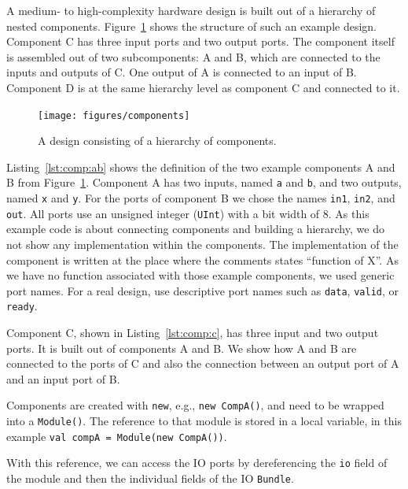 \documentclass[%
    10pt,
    headinclude, footexclude,
    openright, %
    notitlepage,
    cleardoubleempty,
    headsepline,
    pointlessnumbers,
    bibtotoc, idxtotoc,
    ]{scrbook}
\newcommand{\code}[1]{{\small{\texttt{#1}}}}
\begin{document}
A medium- to high-complexity hardware design is built out of a hierarchy of
nested components.
Figure~\ref{fig:components} shows the structure of such an example design. Component C has
three input ports and two output ports. The component itself is assembled out
of two subcomponents: A and B, which are connected to the inputs and
outputs of C. One output of A is connected to an input of B.
Component D is at the same hierarchy level as component C and connected
to it.

\begin{figure}
  \centering
  \texttt{[image: figures/components]}
  \caption{A design consisting of a hierarchy of components.}
  \label{fig:components}
\end{figure}


Listing~\ref{lst:comp:ab} shows the definition of the two example components A and B from
Figure~\ref{fig:components}.
Component A has two inputs, named \code{a} and \code{b}, and two
outputs, named \code{x} and \code{y}. For the ports of component B
we chose the names \code{in1}, \code{in2}, and \code{out}.
All ports use an unsigned integer (\code{UInt}) with a bit width of 8.
As this example code is about connecting components and building a
hierarchy, we do not show any implementation within the components.
The implementation of the component is written at the place where
the comments states ``function of X''.
As we have no function associated with those example components,
we used generic port names. For a real design, use descriptive
port names such as \code{data}, \code{valid}, or \code{ready}.

Component C, shown in Listing~\ref{lst:comp:c}, has three input and two output ports. It is built out of
components A and B. We show how A and B are connected to the ports
of C and also the connection between an output port of A and an
input port of B.


Components are created with \code{new}, e.g., \code{new CompA()}, and need to be wrapped
into a \code{Module()}. The reference to that module is stored in a local variable,
in this example \code{val compA = Module(new CompA())}.

With this reference, we can access the IO ports by dereferencing the \code{io} field of the module
and then the individual fields of the IO \code{Bundle}.
\end{document}
